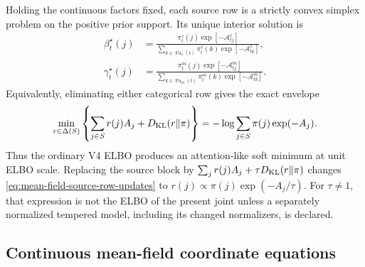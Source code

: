Holding the continuous factors fixed, each source row is a strictly convex simplex problem on the positive prior support. Its unique interior solution is
\begin{equation}
\begin{aligned}
\beta_t^\star(j)
&=\frac{\pi_t^z(j)\exp[-\mathcal A_{tj}^z]}
{\sum_{k\in\operatorname{Pa}_z(t)}
\pi_t^z(k)\exp[-\mathcal A_{tk}^z]},\\
\gamma_t^\star(j)
&=\frac{\pi_t^m(j)\exp[-\mathcal A_{tj}^m]}
{\sum_{k\in\operatorname{Pa}_m(t)}
\pi_t^m(k)\exp[-\mathcal A_{tk}^m]}.
\end{aligned}
\label{eq:mean-field-source-row-updates}
\end{equation}
Equivalently, eliminating either categorical row gives the exact envelope
\begin{equation}
\min_{r\in\Delta(S)}
\left\{
\sum_{j\in S}r(j)A_j+D_{\mathrm{KL}}(r\Vert\pi)
\right\}
=-\log\sum_{j\in S}\pi(j)\exp(-A_j).
\label{eq:mean-field-source-row-envelope}
\end{equation}
Thus the ordinary V4 ELBO produces an attention-like soft minimum at unit ELBO scale. Replacing the source block by $\sum_jr(j)A_j+\tau D_{\mathrm{KL}}(r\Vert\pi)$ changes \cref{eq:mean-field-source-row-updates} to $r(j)\propto\pi(j)\exp(-A_j/\tau)$. For $\tau\ne1$, that expression is not the ELBO of the present joint unless a separately normalized tempered model, including its changed normalizers, is declared.

\subsection{Continuous mean-field coordinate equations}

